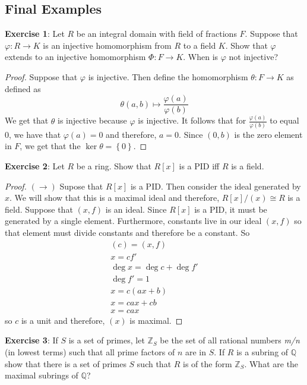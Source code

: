 \documentclass{article}
\begin{document}
\begin{topic}
    \section*{Final Examples}
\end{topic}

\textbf{Exercise 1}: Let $R$ be an integral domain with field of fractions $F$. Suppose that $\varphi : R \rightarrow K$ is an injective homomorphism from $R$ to a field $K$. Show that $\varphi$ extends to an injective homomorphism $\varPhi : F \rightarrow K$. When is $\varphi$ not injective?

\begin{proof}
	Suppose that $\varphi$ is injective. Then define the homomorphism $\theta: F \rightarrow K$ as defined as 
	\begin{equation*}
		\theta (a, b) \mapsto \dfrac{\varphi(a)}{\varphi(b)} 
	\end{equation*}
	We get that $\theta$ is injective because $\varphi$ is injective. It follows that for $\frac{\varphi(a)}{\varphi(b)}$ to equal 0, we have that $\varphi(a) = 0$ and therefore, $a = 0$. Since $(0, b)$ is the zero element in $F$, we get that the $\ker{\theta} = \left\{0\right\}$.
\end{proof}

\textbf{Exercise 2}: Let $R$ be a ring. Show that $R[x]$ is a PID iff $R$ is a field.

\begin{proof}
	$(\rightarrow)$ Supose that $R[x]$ is a PID. Then consider the ideal generated by $x$. We will show that this is a maximal ideal and therefore, $R[x]/(x) \cong R$ is a field. Suppose that $(x, f)$ is an ideal. Since $R[x]$ is a PID, it must be generated by a single element. Furthermore, constants live in our ideal $(x, f)$ so that element must divide constants and therefore be a constant. So 
	\begin{align*}
		(c) = (x, f) \\
		x = cf'\\
		\deg{x} = \deg{c} + \deg{f'} \\
		\deg{f'} = 1 \\
		x = c(ax + b) \\
		x = cax + cb \\
		x = cax 
	\end{align*}
so $c$ is a unit and therefore, $(x)$ is maximal.  
\end{proof}

\textbf{Exercise 3}: If $S$ is a set of primes, let $\mathbb{Z}_{S}$ be the set of all rational numbers \textit{m/n} (in lowest terms) such that all prime factors of $n$ are in $S$. If $R$ is a subring of 
$\mathbb{Q}$ show that there is a set of primes $S$ such that $R$ is of the form $\mathbb{Z}_{S}$. What are the maximal subrings of $\mathbb{Q}$?
\end{document}

